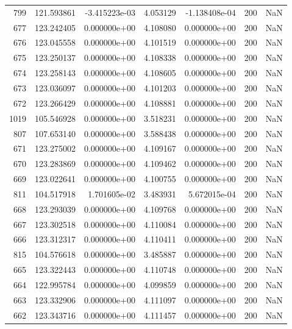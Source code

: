 \begin{tabular}{rrrrrrr}
 799 & 121.593861 & -3.415223e-03 &  4.053129 & -1.138408e-04 &         200 & NaN \\
 677 & 123.242405 &  0.000000e+00 &  4.108080 &  0.000000e+00 &         200 & NaN \\
 676 & 123.045558 &  0.000000e+00 &  4.101519 &  0.000000e+00 &         200 & NaN \\
 675 & 123.250137 &  0.000000e+00 &  4.108338 &  0.000000e+00 &         200 & NaN \\
 674 & 123.258143 &  0.000000e+00 &  4.108605 &  0.000000e+00 &         200 & NaN \\
 673 & 123.036097 &  0.000000e+00 &  4.101203 &  0.000000e+00 &         200 & NaN \\
 672 & 123.266429 &  0.000000e+00 &  4.108881 &  0.000000e+00 &         200 & NaN \\
1019 & 105.546928 &  0.000000e+00 &  3.518231 &  0.000000e+00 &         200 & NaN \\
 807 & 107.653140 &  0.000000e+00 &  3.588438 &  0.000000e+00 &         200 & NaN \\
 671 & 123.275002 &  0.000000e+00 &  4.109167 &  0.000000e+00 &         200 & NaN \\
 670 & 123.283869 &  0.000000e+00 &  4.109462 &  0.000000e+00 &         200 & NaN \\
 669 & 123.022641 &  0.000000e+00 &  4.100755 &  0.000000e+00 &         200 & NaN \\
 811 & 104.517918 &  1.701605e-02 &  3.483931 &  5.672015e-04 &         200 & NaN \\
 668 & 123.293039 &  0.000000e+00 &  4.109768 &  0.000000e+00 &         200 & NaN \\
 667 & 123.302518 &  0.000000e+00 &  4.110084 &  0.000000e+00 &         200 & NaN \\
 666 & 123.312317 &  0.000000e+00 &  4.110411 &  0.000000e+00 &         200 & NaN \\
 815 & 104.576618 &  0.000000e+00 &  3.485887 &  0.000000e+00 &         200 & NaN \\
 665 & 123.322443 &  0.000000e+00 &  4.110748 &  0.000000e+00 &         200 & NaN \\
 664 & 122.995784 &  0.000000e+00 &  4.099859 &  0.000000e+00 &         200 & NaN \\
 663 & 123.332906 &  0.000000e+00 &  4.111097 &  0.000000e+00 &         200 & NaN \\
 662 & 123.343716 &  0.000000e+00 &  4.111457 &  0.000000e+00 &         200 & NaN \\

\end{tabular}
